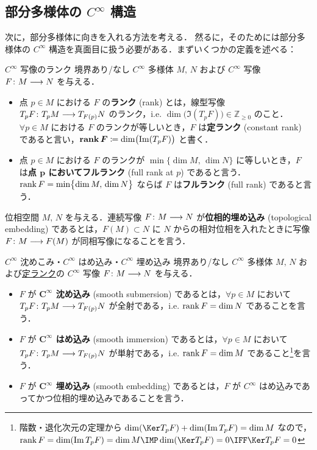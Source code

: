 \documentclass[geometry_main]{subfiles}
\begin{document}
\subsection{部分多様体の $C^\infty$ 構造}

次に，部分多様体に向きを入れる方法を考える．
然るに，そのためには部分多様体の $C^\infty$ 構造を真面目に扱う必要がある．まずいくつかの定義を述べる：

\begin{mydef}[label=def:rank-smooth]{$C^\infty$ 写像のランク}
    境界あり/なし $C^\infty$ 多様体 $M,\, N$ および $C^\infty$ 写像 $F \colon M \longrightarrow N$ を与える．
    \begin{itemize}
        \item 点 $p \in M$ における $F$ の\textbf{ランク} (rank) とは，線型写像 $T_p F \colon T_p M \longrightarrow T_{F(p)} N$ のランク，i.e. $\dim \bigl(\Im (T_p F)\bigr) \in \mathbb{Z}_{\ge 0}$ のこと．$\forall p \in M$ における $F$ のランクが等しいとき，$F$ は\textbf{定ランク} (constant rank) であると言い，$\bm{\rank F} \coloneqq \dim \bigl(\Im (T_p F)\bigr)$ と書く．
        \item 点 $p \in M$ における $F$ のランクが $\min \bigl\{\dim M,\, \dim N\bigr\}$ に等しいとき，$F$ は\textbf{点 $\bm{p}$ においてフルランク} (full rank at $p$) であると言う．
        $\rank F = \min \bigl\{\dim M,\, \dim N\bigr\}$ ならば $F$ は\textbf{フルランク} (full rank) であると言う．
    \end{itemize}
\end{mydef}

位相空間 $M,\, N$ を与える．連続写像 $F \colon M \longrightarrow N$ が\textbf{位相的埋め込み} (topological embedding) であるとは，$F(M) \subset N$ に $N$ からの相対位相を入れたときに写像 $F \colon M \longrightarrow F(M)$ が同相写像になることを言う．

\begin{mydef}[label=def:submersion-smooth]{$C^\infty$ 沈めこみ・$C^\infty$ はめ込み・$C^\infty$ 埋め込み}
    境界あり/なし $C^\infty$ 多様体 $M,\, N$ および\hyperref[def:rank-smooth]{定ランク}の $C^\infty$ 写像 $F \colon M \longrightarrow N$ を与える．
    \begin{itemize}
        \item $F$ が\textbf{ $\bm{C^\infty}$ 沈め込み} (smooth submersion) であるとは，$\forall p \in M$ において $T_p F \colon T_p M \longrightarrow T_{F(p)} N$ が全射である，i.e. $\rank F = \dim N$ であることを言う．
        \item $F$ が\textbf{ $\bm{C^\infty}$ はめ込み} (smooth immersion) であるとは，$\forall p \in M$ において $T_p F \colon T_p M \longrightarrow T_{F(p)} N$ が単射である，i.e. $\rank F = \dim M$ であること\footnote{階数・退化次元の定理から $\dim (\Ker T_p F) + \dim (\Im T_p F) = \dim M$ なので，$\rank F = \dim (\Im T_p F) = \dim M \IMP \dim (\Ker T_p F) = 0 \IFF \Ker T_p F = 0$}を言う．
        \item $F$ が\textbf{ $\bm{C^\infty}$ 埋め込み} (smooth embedding) であるとは，$F$ が $C^\infty$ はめ込みであってかつ位相的埋め込みであることを言う．
    \end{itemize}
\end{mydef}
\end{document}
